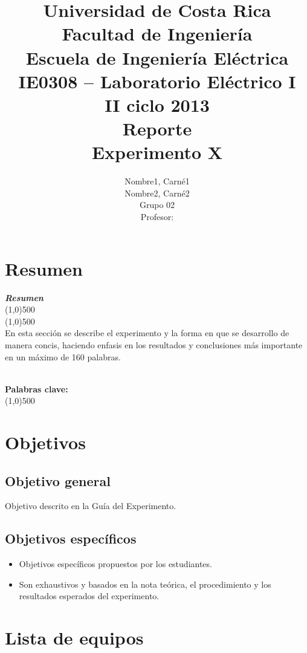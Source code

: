 \documentclass[12pt,letterpaper]{article}     %
\author{Nombre1, Carné1 \\ Nombre2, Carné2 \\ {\small Grupo 02}\\ Profesor:  \vspace*{3.0in}}
\title{Universidad de Costa Rica\\{\small Facultad de Ingeniería\\Escuela de Ingeniería Eléctrica\\IE0308 – Laboratorio Eléctrico I\\II ciclo 2013\\\vspace*{0.55in} Reporte}\\ Experimento X\vspace*{1.35in}}
\makeatletter
\newcounter{resumen}
\newenvironment{resumen}
{	
	\begin{center}
	\begin{minipage}[t]{500 pt}
	\vspace{5mm}
	\emph{\textbf{Resumen}}
	\\[-2mm]
	\line(1,0){500}
	\\[-4.25 mm]
	\line(1,0){500}
	\\
}
{
	\normalsize
	\\[2mm]
	\footnotesize\textbf{Palabras clave: \footnotesize\@palabras}
	\\[-2mm]
	\line(1,0){500}
	\\[0.5cm]
	\end{minipage}
	\end{center}
}
\makeatother
\begin{document}


\maketitle							%


\tableofcontents
\newpage
\listoffigures
\listoftables

\newpage
\section{Resumen}
\begin{resumen}
En esta sección se describe el experimento y la forma en que se desarrollo de manera concis, haciendo enfasis en los resultados y conclusiones más importante en un máximo de 160 palabras.
\end{resumen}


\section{Objetivos}

\subsection{Objetivo general}

Objetivo descrito en la Guía del Experimento.


\subsection{Objetivos específicos}

\begin{itemize}
\item Objetivos específicos propuestos por los estudiantes.
\item Son exhaustivos y basados en la nota teórica, el procedimiento y los resultados esperados del experimento.
\end{itemize}

\newpage

\section{Lista de equipos}
\end{document}
